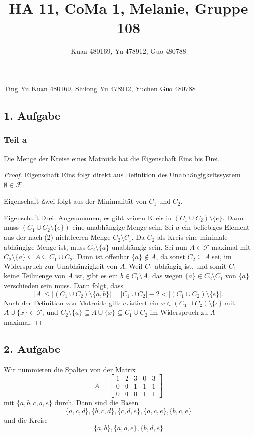 \documentclass[fleqn,draft,a4paper,11pt]{article}
\title{HA 11, CoMa 1, Melanie, Gruppe 108}
\author{Kuan 480169, Yu 478912, Guo 480788}
\providecommand{\abs}[1]{\left\lvert#1\right\rvert}
\theoremstyle{remark}
\begin{document}
\maketitle
\begin{center}
Ting Yu Kuan 480169, Shilong Yu 478912, Yuchen Guo 480788
\end{center}
\newpage
\subsection{1. Aufgabe}
\subsubsection{Teil a}
Die Menge der Kreise eines Matroids hat die Eigenschaft Eins bis Drei.

\begin{proof}
  Eigenschaft Eins folgt direkt aus Definition des
  Unabhängigkeitssystem \(\emptyset \in \mathcal{F}\).

  Eigenschaft Zwei folgt aus der Minimalität von \(C_{1}\) und \(C_{2}\).

  Eigenschaft Drei.  Angenommen, es gibt keinen Kreis in \((C_{1} \cup
  C_{2}) \setminus \{e\}\).  Dann muss \((C_{1} \cup C_{2} \setminus \{e\})\) eine
  unabhängige Menge sein.  Sei \(a\) ein beliebiges Element aus der nach
  (2) nichtleeren Menge \(C_{2} \setminus C_{1}\).  Da \(C_{2}\) als Kreis eine
  minimale abhängige Menge ist, muss \(C_{2} \setminus \{a\}\) unabhängig sein.
  Sei nun \(A \in \mathcal{F}\) maximal mit \(C_{2} \setminus \{a\} \subseteq A \subseteq C_{1} \cup C_{2}\).
  Dann ist offenbar \(\{a\} \notin A\), da sonst \(C_{2} \subseteq A\) sei, im
  Widerspruch zur Unabhängigkeit von \(A\).  Weil \(C_{1}\) abhängig ist,
  und somit \(C_{1}\) keine Teilmenge von \(A\) ist, gibt es ein \(b \in
  C_{1} \setminus A\), das wegen \(\{a\} \in C_{2} \setminus C_{1}\) von \(\{a\}\)
  verschieden sein muss.  Dann folgt, dass
  \[\abs{A} \le \abs{(C_{1} \cup C_{2}) \setminus \{a, b\}} = \abs{C_{1} \cup C_{2}}
    - 2 < \abs{(C_{1} \cup C_{2}) \setminus \{e\}}.\]
  Nach der Definition von Matroide gilt: existiert ein \(x \in (C_{1} \cup
  C_{2}) \setminus \{e\}\) mit \(A \cup \{x\} \in \mathcal{F}\), und \(C_{2} \setminus \{a\} \subseteq A \cup \{x\}
  \subseteq C_{1} \cup C_{2}\) im Widerspruch zu \(A\) maximal.
\end{proof}
\subsection{2. Aufgabe}
Wir nummieren die Spalten von der Matrix
\[ A =
  \begin{bmatrix}
    1 & 2 & 3 & 0 & 3 \\
    0 & 0 & 1 & 1 & 1 \\
    0 & 0 & 0 & 1 & 1
  \end{bmatrix}
\]
mit \(\{a,b,c,d,e\}\) durch.  Dann sind die Basen
\[\{a,c,d\}, \{b,c,d\}, \{c,d,e\}, \{a,c,e\}, \{b,c,e\}\]
und die Kreise
\[\{a,b\},\{a,d,e\},\{b,d,e\}\]
\end{document}
